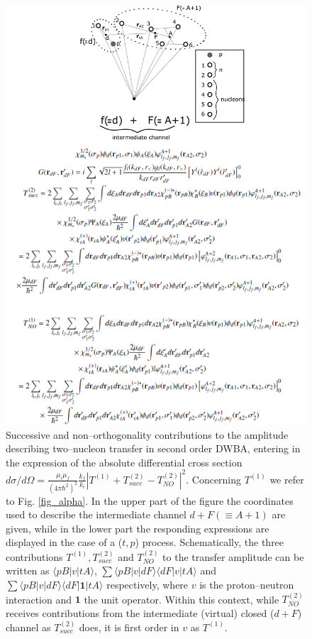 \begin{figure}
\centerline{\includegraphics*[width=\textwidth,angle=0]{nutshell/figs/fig_beta.pdf}}
\caption{Successive and non--orthogonality contributions to the  amplitude describing two--nucleon transfer in second order DWBA, entering in the expression of the absolute differential cross section $d\sigma/d\Omega=\tfrac{\mu_i\mu_f}{(4\pi\hbar^2)^2}\tfrac{k_f}{k_i}\left|T^{(1)}+T_{succ}^{(2)}-T^{(2)}_{NO}\right|^2$. Concerning $T^{(1)}$ we refer to Fig. \ref{fig_alpha}. In the upper part of the figure the coordinates used to describe the intermediate channel $d+F(\equiv A+1)$ are given, while in the lower part the responding expressions are displayed \citep{Potel:13b} in the case of a ($t,p$) process. Schematically, the three contributions $T^{(1)}, T^{(2)}_{succ}$ and $T^{(2)}_{NO}$ to the transfer amplitude can be written as $\langle pB|v|tA\rangle$, $\sum \langle pB|v|dF\rangle\langle dF|v|tA\rangle$ and $\sum \langle pB|v|dF\rangle\langle dF| \mathbf{1}|tA\rangle$ respectively, where $v$ is the proton--neutron interaction and $\mathbf 1$ the unit operator. Within this context, while $T^{(2)}_{NO}$ receives contributions from the intermediate (virtual) closed ($d+F$) channel as $T^{(2)}_{succ}$ does, it is first order in $v$ as $T^{(1)}$.}\label{fig_beta}
\end{figure}
